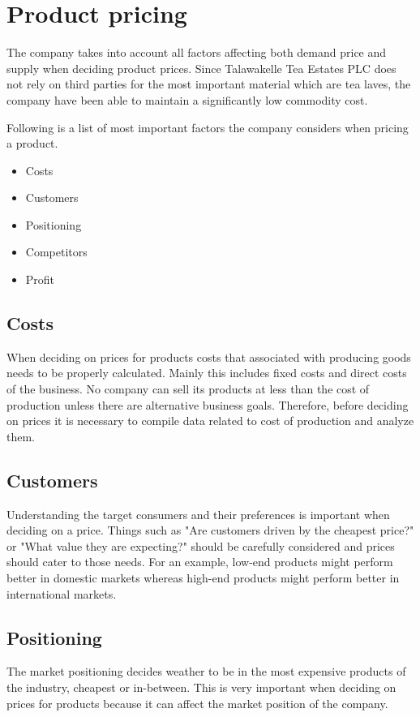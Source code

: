 \documentclass[12pt]{report}
\begin{document}
\chapter{Product pricing}
The company takes into account all factors affecting both demand price and supply when deciding product prices. Since Talawakelle Tea Estates PLC does not rely on third parties for the most important material which are tea laves, the company have been able to maintain a significantly low commodity cost.

Following is a list of most important factors the company considers when pricing a product.

\begin{itemize}
	\item {Costs}
	\item {Customers}
	\item {Positioning}
	\item {Competitors}
	\item {Profit}
\end{itemize}

\section{Costs}
When deciding on prices for products costs that associated with producing goods needs to be properly calculated. Mainly this includes fixed costs and direct costs of the business. No company can sell its products at less than the cost of production unless there are alternative business goals. Therefore, before deciding on prices it is necessary to compile data related to cost of production and analyze them.

\section{Customers}
Understanding the target consumers and their preferences is important when deciding on a price. Things such as "Are customers driven by the cheapest price?" or "What value they are expecting?" should be carefully considered and prices should cater to those needs. For an example, low-end products might perform better in domestic markets whereas high-end products might perform better in international markets.

\section{Positioning}
The market positioning decides weather to be in the most expensive products of the industry, cheapest or in-between. This is very important when deciding on prices for products because it can affect the market position of the company.
\end{document}
